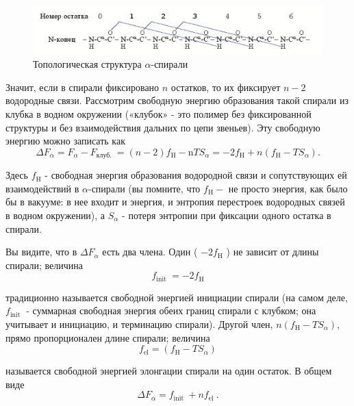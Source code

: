 \documentclass[
11pt,%
tightenlines,%
twoside,%
onecolumn,%
nofloats,%
nobibnotes,%
nofootinbib,%
superscriptaddress,%
noshowpacs,%
centertags]%
{revtex4}
\begin{document}
\begin{figure}[!ht]
	\includegraphics[width=\textwidth]{ostatok}
	\caption{Топологическая структура $\alpha$-спирали}
\end{figure}

Значит, если в спирали фиксировано $n$ остатков, то их фиксирует $n-2$ водородные связи. Рассмотрим свободную энергию образования такой спирали из клубка в водном окружении («клубок» - это полимер без фиксированной структуры и без взаимодействия дальних по цепи звеньев). Эту свободную энергию можно записать как
\begin{equation}
	\Delta F_\alpha=F_\alpha-F_{\text {клуб. }}=(n-2) f_{\mathrm{H}}-\mathrm{n} T S_\alpha=-2 f_{\mathrm{H}}+n\left(f_{\mathrm{H}}-T S_\alpha\right) .
\end{equation}

Здесь $f_{\mathrm{H}}$ - свободная энергия образования водородной связи и сопутствующих ей взаимодействий в $\alpha$-спирали (вы помните, что $f_{\mathrm{H}}-$ не просто энергия, как было бы в вакууме: в нее входит и энергия, и энтропия перестроек водородных связей в водном окружении), а $S_\alpha$ - потеря энтропии при фиксации одного остатка в спирали.

Вы видите, что в $\Delta F_\alpha$ есть два члена. Один ( $-2 f_{\mathrm{H}}$ ) не зависит от длины спирали; величина
\begin{equation}
	f_{\text {init }}=-2 f_{\mathrm{H}}
\end{equation}

традиционно называется свободной энергией инициации спирали (на самом деле, $f_{\text {init }}$ - суммарная свободная энергия обеих границ спирали с клубком; она учитывает и инициацию, и терминацию спирали). Другой член, $n\left(f_{\mathrm{H}}-T S_\alpha\right)$, прямо пропорционален длине спирали; величина
\begin{equation}
	f_{\mathrm{el}}=\left(f_{\mathrm{H}}-T S_\alpha\right)
\end{equation}

называется свободной энергией элонгации спирали на один остаток. В общем виде
\begin{equation}
	\Delta F_\alpha=f_{\text {init }}+n f_{\text {el }} .
\end{equation}
\end{document}

